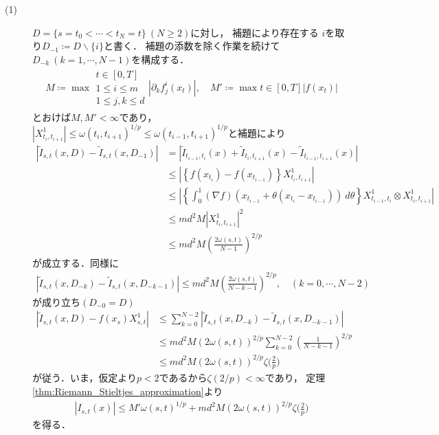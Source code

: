 	\begin{prf}\mbox{}
		\begin{description}
			\item[(1)] $D = \{s=t_0 < \cdots < t_N = t\}\ (N \geq 2)$に対し，
				補題により存在する
				$i$を取り$D_{-1} \coloneqq D \backslash \{i\}$と書く．
				補題の添数を除く作業を続けて
				$D_{-k}\ (k=1,\cdots,N-1)$を構成する．
				\begin{align}
					M \coloneqq \max{
					\substack{t \in [0,T] \\ 1 \leq i \leq m \\ 1 \leq j,k \leq d}}
					{\left| \partial_k f^i_j(x_t) \right|},
					\quad 
					M' \coloneqq \max{t \in [0,T]}{\left| f(x_t) \right|}
				\end{align}
				とおけば$M,M' < \infty$であり，$\left| X^1_{t_i,t_{i+1}} \right| \leq \omega(t_i,t_{i+1})^{1/p} \leq \omega(t_{i-1},t_{i+1})^{1/p}$と補題により
				\begin{align}
					\left| \tilde{I}_{s,t}(x,D) - \tilde{I}_{s,t}(x,D_{-1}) \right|
					&= \left| \tilde{I}_{t_{i-1},t_i}(x) + \tilde{I}_{t_i,t_{i+1}}(x) - \tilde{I}_{t_{i-1},t_{i+1}}(x) \right| \\
					& \leq \left| \left\{ f(x_{t_i}) - f(x_{t_{i-1}}) \right\} X^1_{t_i,t_{i+1}} \right| \\
					&\leq \left| \left\{ \int_0^1 (\nabla f)(x_{t_{i-1}} + \theta (x_{t_i}-x_{t_{i-1}}))\ d\theta \right\} X^1_{t_{i-1},t_i} \otimes X^1_{t_i,t_{i+1}} \right| \\
					&\leq md^2 M \left| X^1_{t_i,t_{i+1}} \right|^2 \\
					&\leq md^2 M \left( \frac{2\omega(s,t)}{N-1} \right)^{2/p}
				\end{align}
				が成立する．同様に
				\begin{align}
					\left| \tilde{I}_{s,t}(x,D_{-k}) - \tilde{I}_{s,t}(x,D_{-k-1}) \right|
					\leq md^2 M \left( \frac{2\omega(s,t)}{N-k-1} \right)^{2/p},
					\quad(k=0,\cdots,N-2)
				\end{align}
				が成り立ち$(D_{-0} = D)$
				\begin{align}
					\left| \tilde{I}_{s,t}(x,D) - f(x_s)X^1_{s,t} \right|
					&\leq \sum_{k=0}^{N-2} \left| \tilde{I}_{s,t}(x,D_{-k}) - \tilde{I}_{s,t}(x,D_{-k-1}) \right| \\
					&\leq md^2 M (2\omega(s,t))^{2/p} \sum_{k=0}^{N-2} \left( \frac{1}{N-k-1} \right)^{2/p} \\
					&\leq md^2 M (2\omega(s,t))^{2/p} \zeta\biggl(\frac{2}{p}\biggr)
				\end{align}
				が従う．いま，仮定より$p < 2$であるから$\zeta(2/p) < \infty$であり，
				定理\ref{thm:Riemann_Stieltjes_approximation}より
				\begin{align}
					\left| I_{s,t}(x) \right|
					\leq M' \omega(s,t)^{1/p} + md^2 M (2\omega(s,t))^{2/p} \zeta\biggl(\frac{2}{p}\biggr)
				\end{align}
				を得る．
				

\end{description}
\end{prf}
